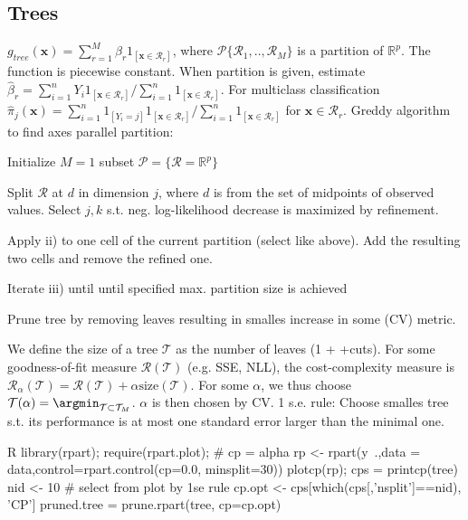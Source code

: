 \subsection{Trees}%
\label{sub:trees}
\begin{sectionbox}\nospacing{}
$g_{tree}(\mathbf{x}) = \sum_{r=1}^{M}\beta_r 1_{[\mathbf{x}\in \mathcal{R}_r]}$, where $\mathcal{P} \{\mathcal{R}_1,.., \mathcal{R}_M\}$ is a partition of $\mathbb{R}^p$. The function is piecewise constant. When partition is given, estimate $\hat{\beta}_r = \sum_{i=1}^{n}Y_i 1_{[\mathbf{x}\in \mathcal{R}_r]}/\sum_{i=1}^{n}1_{[\mathbf{x}\in \mathcal{R}_r]}$. For multiclass classification $\hat{\pi}_j(\mathbf{x}) = \sum_{i=1}^{n}1_{[Y_i =j]} 1_{[\mathbf{x}\in \mathcal{R}_r]}/\sum_{i=1}^{n}1_{[\mathbf{x}\in \mathcal{R}_r]}$ for $\mathbf{x} \in \mathcal{R}_r$. Greddy algorithm to find axes parallel partition:
\begin{enumeratenosep}[label=\roman*]
	\item Initialize $M=1$ subset $\mathcal{P} = \{\mathcal{R} = \mathbb{R}^p\}$
	\item Split $\mathcal{R}$ at $d$ in dimension $j$, where $d$ is from the set of midpoints of observed values. Select $j,k$ s.t. neg. log-likelihood decrease is maximized by refinement.
	\item Apply ii) to one cell of the current partition (select like above). Add the resulting two cells and remove the refined one. 
	\item Iterate iii) until until specified max. partition size is achieved
	\item Prune tree by removing leaves resulting in smalles increase in some (CV) metric.
\end{enumeratenosep}
We define the size of a tree $\mathcal{T}$ as the number of leaves (1 + +cuts). For some goodness-of-fit measure $\mathcal{R}(\mathcal{T})$ (e.g. SSE, NLL), the cost-complexity measure is $\mathcal{R}_{\alpha}(\mathcal{T})=\mathcal{R}(\mathcal{T}) + \alpha \text{size}(\mathcal{T}) $. For some $\alpha$, we thus choose $\mathcal{T}(\alpha) = \argmin_{\mathcal{T}\subset\mathcal{T}_M}$. $\alpha$ is then chosen by CV. 1 s.e. rule: Choose smalles tree s.t. its performance is at most one standard error larger than the minimal one. 

\begin{mintlinebox}{R}
library(rpart); require(rpart.plot); 
# cp = alpha
rp <- rpart(y~.,data = data,control=rpart.control(cp=0.0, minsplit=30))
plotcp(rp); cps = printcp(tree)
nid <- 10 # select from plot by 1se rule
cp.opt <- cps[which(cps[,'nsplit']==nid), 'CP']
pruned.tree = prune.rpart(tree, cp=cp.opt)
\end{mintlinebox}
\end{sectionbox}



